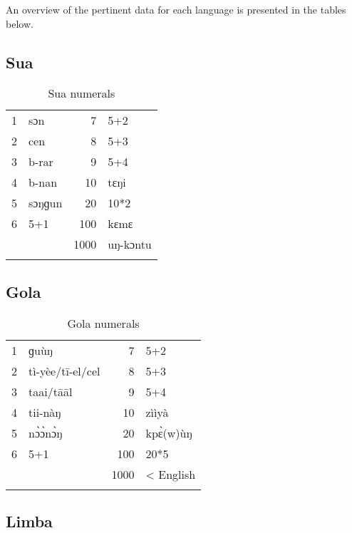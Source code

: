 {An overview of the pertinent data for each language is presented in the tables below.


\subsection{Sua}%
\begin{table}
\caption{\label{tab:3:248}Sua numerals}


\begin{tabularx}{\textwidth}{lQrQ}
\lsptoprule

1 & sɔn & 7 & 5+2\\
2 & cen & 8 & 5+3\\
3 & b-rar & 9 & 5+4\\
4 & b-nan & 10 & tɛŋi\\
5 & sɔŋɡun & 20 & 10*2\\
6 & 5+1 & 100 & kɛmɛ\\
&  & 1000 & uŋ-kɔntu\\
\lspbottomrule
\end{tabularx}
\end{table}


\subsection{Gola}%
\begin{table}
\caption{\label{tab:3:249}Gola numerals}


\begin{tabularx}{\textwidth}{lQrQ}
\lsptoprule

1 & ɡu{\`{u}}ŋ & 7 & 5+2\\
2 & tì-yèe/t{\={i}}-el/cel & 8 & 5+3\\
3 & taai/t{\={a}}{\={a}}l & 9 & 5+4\\
4 & tii-nàŋ & 10 & zììyà\\
5 & n{\`{ɔ}}{\`{ɔ}}n{\`{ɔ}}ŋ & 20 & kp{\`{ɛ}}(w){\`{u}}ŋ\\
6 & 5+1 & 100 & 20*5\\
&  & 1000 & < English\\
\lspbottomrule
\end{tabularx}
\end{table}

\clearpage 
\subsection{Limba}%

}
